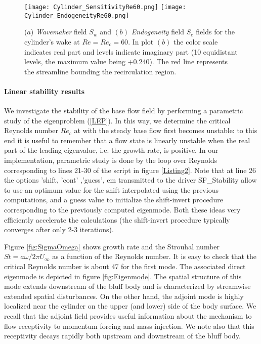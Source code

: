 \documentclass[twocolumn,10pt]{asme2ej}
\begin{document}
\begin{figure}
\texttt{[image: Cylinder\_SensitivityRe60.png]}
\texttt{[image: Cylinder\_EndogeneityRe60.png]}
\caption{ ($a$) {\em Wavemaker}  field $S_w$ and $(b)$ {\em Endogeneity} field $S_e$ fields for the cylinder's wake at $Re=Re_c = 60$.  In plot $(b)$ the color scale indicates real part and levels indicate imaginary part (10 equidistant levels, the maximum value being +0.240). The red line represents the streamline bounding the recirculation region.}
\label{fig:StructEndo}
\end{figure}




\paragraph{Linear stability results}

We investigate the stability of the base flow field by performing a parametric study of the eigenproblem (\ref{LEP}). In this way, we determine the critical Reynolds number $Re_c$ at with the steady base flow first becomes unstable: to this end it is useful to remember that a flow state is linearly unstable when the real part of  the leading eigenvalue, i.e. the growth rate, is positive. In our implementation, parametric study is done by the loop over Reynolds corresponding to lines 21-30 of the script in figure \ref{Listing2}. Note that at line 26 the options {\sf  'shift, 'cont' ,'guess', em} transmitted to the driver {\sf  SF\_Stability} allow to use an optimum value for the shift interpolated using the previous computations, and a guess value to initialize the shift-invert procedure corresponding to the previously computed eigenmode. Both these ideas very efficiently accelerate the calculations (the shift-invert procedure typically converges after only 2-3 iterations).

 Figure \ref{fig:SigmaOmega} shows growth rate and the Strouhal number $St=a\omega/2 \pi U_{\infty}$ as a function of the Reynolds number. It is easy to check that the critical Reynolds number is about 47 for the first mode. The associated direct eigenmode is depicted in figure \ref{fig:Eigenmode}. The spatial structure of this mode extends downstream of the bluff body and is characterized by streamwise extended spatial disturbances.  On the other hand, the adjoint mode is highly localized near the cylinder  on the upper (and lower) side of the body surface. We recall that the adjoint field provides useful information about the mechanism to flow receptivity to momentum forcing and mass injection. We note also that this receptivity decays rapidly both upstream and downstream of the bluff body.
\end{document}
